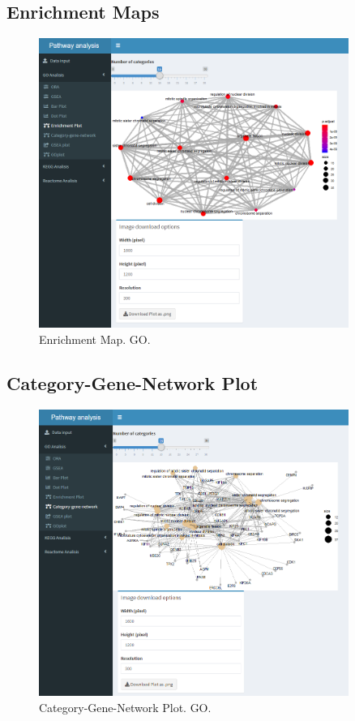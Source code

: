 \subsection{\gls{Enrichment Map}s}

\begin{figure}[H]
\centering
\includegraphics[width=0.9\textwidth]{figures/App_F16_Items_GO_Emap.png} 
\caption{\gls{Enrichment Map}. GO.}
\end{figure}

\subsection{Category-Gene-Network Plot}

\begin{figure}[H]
\centering
\includegraphics[width=0.9\textwidth]{figures/App_F17_Items_GO_CnetPlot.png} 
\caption{Category-Gene-Network Plot. GO.}
\end{figure}

